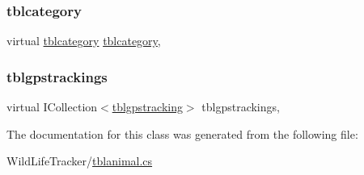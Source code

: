 \subsubsection{\texorpdfstring{tblcategory}{tblcategory}}
{\footnotesize\ttfamily virtual \hyperlink{classWildLifeTracker_1_1tblcategory}{tblcategory} \hyperlink{classWildLifeTracker_1_1tblcategory}{tblcategory}\hspace{0.3cm}{\ttfamily [get]}, {\ttfamily [set]}}

\mbox{\label{classWildLifeTracker_1_1tblanimal_af00c7cc8fc89df2b998c54b894a5d5c5}} 
\subsubsection{\texorpdfstring{tblgpstrackings}{tblgpstrackings}}
{\footnotesize\ttfamily virtual I\+Collection$<$\hyperlink{classWildLifeTracker_1_1tblgpstracking}{tblgpstracking}$>$ tblgpstrackings\hspace{0.3cm}{\ttfamily [get]}, {\ttfamily [set]}}



The documentation for this class was generated from the following file\+:\begin{DoxyCompactItemize}
\item 
Wild\+Life\+Tracker/\hyperlink{tblanimal_8cs}{tblanimal.\+cs}\end{DoxyCompactItemize}
